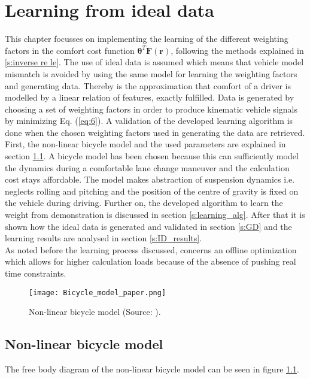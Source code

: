 \chapter{Learning from ideal data}
\label{cha:Learning_algorithm}
This chapter focusses on implementing the learning of the different weighting factors in the comfort cost function $\bm{\theta}^T\bm{F}(\bm{r})$, following the methods explained in \ref{s:inverse re le}. The use of ideal data is assumed which means that vehicle model mismatch is avoided by using the same model for learning the weighting factors and generating data. Thereby is the approximation that comfort of a driver is modelled by a linear relation of features, exactly fulfilled. Data is generated by choosing a set of weighting factors in order to produce kinematic vehicle signals by minimizing Eq. (\ref{eq:6}). A validation of the developed learning algorithm is done when the chosen weighting factors used in generating the data are retrieved.\\

First, the non-linear bicycle model and the used parameters are explained in section \ref{sec:Vehicle_models}. A bicycle model has been chosen because this can sufficiently model the dynamics during a comfortable lane change maneuver and the calculation cost stays affordable. The model makes abstraction of suspension dynamics i.e. neglects rolling and pitching and the position of the centre of gravity is fixed on the vehicle during driving. \cite{Yankov}  Further on, the developed algorithm to learn the weight from demonstration is discussed in section \ref{s:learning_alg}. After that it is shown how the ideal data is generated and validated in section \ref{s:GD} and the learning results are analysed in section \ref{s:ID_results}.\\
As noted before the learning process discussed, concerns an offline optimization which allows for higher calculation loads because of the absence of pushing real time constraints.

\begin{figure}[h!]
	\centering
	\texttt{[image: Bicycle\_model\_paper.png]}
	\caption{Non-linear bicycle model (Source: \cite{TongDuySon2019}).}
	\label{fig:bicycle_model}
\end{figure}

\section{Non-linear bicycle model}\label{sec:Vehicle_models}
The free body diagram of the non-linear bicycle model can be seen in figure \ref{fig:bicycle_model}.

